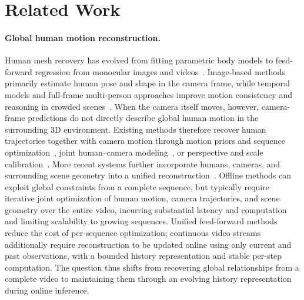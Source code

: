 \section{Related Work}

\paragraph{Global human motion reconstruction.}
Human mesh recovery has evolved from fitting parametric body models to
feed-forward regression from monocular images and
videos~\citep{kanazawa2018hmr,kocabas2020vibe,goel2023humans4d}. Image-based
methods primarily estimate human pose and shape in the camera frame, while
temporal models and full-frame multi-person approaches improve motion
consistency and reasoning in crowded
scenes~\citep{sun2021romp,sun2022bev,sun2023trace,baradel2024multihmr,wang2025prompthmr,sun2024aios}.
When the camera itself moves, however, camera-frame predictions do not directly
describe global human motion in the surrounding 3D environment. Existing
methods therefore recover human trajectories together with camera motion
through motion priors and sequence
optimization~\citep{yuan2022glamr,ye2023slahmr,kocabas2024pace,li2024coin},
joint human--camera
modeling~\citep{wang2024tram,shin2024wham,shen2024gvhmr,yin2024whac}, or
perspective and scale
calibration~\citep{patel2025camerahmr,yang2025checkerboards}. More recent
systems further incorporate humans, cameras, and surrounding scene geometry
into a unified
reconstruction~\citep{muller2025reconstructing,liu2026josh,zhang2025odhsr,li2026unish,rojas2025hamst3r,yang2026feedforward,liu2026trophies}.
Offline methods can exploit global constraints from a complete sequence, but
typically require iterative joint optimization of human motion, camera
trajectories, and scene geometry over the entire video, incurring substantial
latency and computation and limiting scalability to growing sequences.
Unified feed-forward methods reduce the cost of per-sequence optimization;
continuous video streams additionally require reconstruction to be updated
online using only current and past observations, with a bounded history
representation and stable per-step computation. The question thus shifts from
recovering global relationships from a complete video to maintaining them
through an evolving history representation during online inference.

